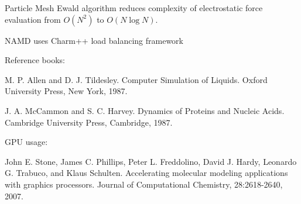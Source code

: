 Particle Mesh Ewald algorithm reduces complexity of electrostatic
force evaluation from $O(N^2)$ to $O(N\log N)$.

NAMD uses Charm++ load balancing framework

Reference books:

M. P. Allen and D. J. Tildesley. 
Computer Simulation of Liquids. 
Oxford University Press, New York, 1987.

J. A. McCammon and S. C. Harvey. 
Dynamics of Proteins and Nucleic Acids. 
Cambridge University Press, Cambridge, 1987.

GPU usage:

John E. Stone, James C. Phillips, Peter L. Freddolino, David J. Hardy,
Leonardo G. Trabuco, and Klaus Schulten. Accelerating molecular
modeling applications with graphics processors. Journal of
Computational Chemistry, 28:2618-2640, 2007.


